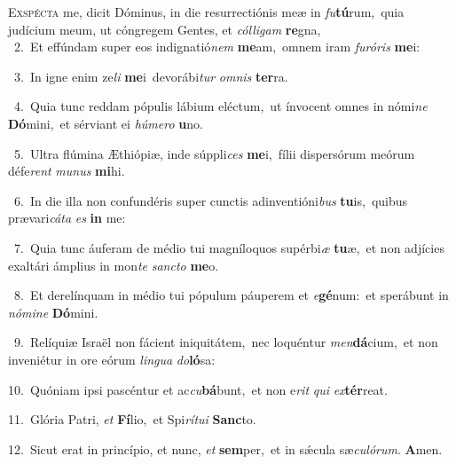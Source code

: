 \lettrine{\initial\textcolor{\initialcolor}{E}}{xspécta} me, dicit Dóminus, in die resurrectiónis meæ in \textit{fu}\-\textbf{tú}rum,~\star quia judícium meum, ut cóngregem Gentes, et \textit{cól}\-\textit{li}\textit{gam} \textbf{re}\-gna,\\
{\numbfont\textcolor{\numbcolor}{~2.}}~Et effúndam super eos indignatió\textit{nem} \textbf{me}\-am,~\star omnem iram \textit{fu}\-\textit{ró}\textit{ris} \textbf{me}\-i:\par
{\numbfont\textcolor{\numbcolor}{~3.}}~In igne enim ze\textit{li} \textbf{me}\-i~\star devorábi\textit{tur} \textit{om}\-\textit{nis} \textbf{ter}\-ra.\par
{\numbfont\textcolor{\numbcolor}{~4.}}~Quia tunc reddam pópulis lábium eléctum,~\dagger ut ínvocent omnes in nómi\textit{ne} \textbf{Dó}\-mini,~\star et sérviant ei \textit{hú}\-\textit{me}\textit{ro} \textbf{u}\-no.\par
{\numbfont\textcolor{\numbcolor}{~5.}}~Ultra flúmina Æthiópiæ, inde súppli\textit{ces} \textbf{me}\-i,~\star fílii dispersórum meórum défe\textit{rent} \textit{mu}\-\textit{nus} \textbf{mi}\-hi.\par
{\numbfont\textcolor{\numbcolor}{~6.}}~In die illa non confundéris super cunctis adinventióni\textit{bus} \textbf{tu}\-is,~\star quibus prævari\-\textit{cá}\-\textit{ta} \textit{es} \textbf{in} me:\par
{\numbfont\textcolor{\numbcolor}{~7.}}~Quia tunc áuferam de médio tui magníloquos supérbi\textit{æ} \textbf{tu}\-æ,~\star et non adjícies exaltári ámplius in mon\textit{te} \textit{sanc}\-\textit{to} \textbf{me}\-o.\par
{\numbfont\textcolor{\numbcolor}{~8.}}~Et derelínquam in médio tui pópulum páuperem et \textit{e}\-\textbf{gé}num:~\star et sperábunt in \textit{nó}\-\textit{mi}\textit{ne} \textbf{Dó}\-mini.\par
{\numbfont\textcolor{\numbcolor}{~9.}}~Relíquiæ Israël non fácient iniquitátem,~\dagger nec loquéntur \textit{men}\-\textbf{dá}cium,~\star et non inveniétur in ore eórum \textit{lin}\-\textit{gua} \textit{do}\-\textbf{ló}sa:\par
{\numbfont\textcolor{\numbcolor}{10.}}~Quóniam ipsi pascéntur et ac\-\textit{cu}\-\textbf{bá}bunt,~\star et non e\textit{rit} \textit{qui} \textit{ex}\-\textbf{tér}reat.\par
{\numbfont\textcolor{\numbcolor}{11.}}~Glória Patri, \textit{et} \textbf{Fí}\-lio,~\star et Spi\-\textit{rí}\-\textit{tu}\textit{i} \textbf{Sanc}\-to.\par
{\numbfont\textcolor{\numbcolor}{12.}}~Sicut erat in princípio, et nunc, \textit{et} \textbf{sem}\-per,~\star et in sǽcula sæ\-\textit{cu}\-\textit{ló}\textit{rum}. \textbf{A}\-men.\par
